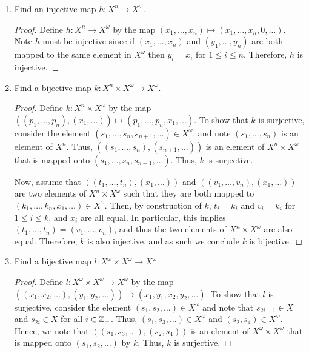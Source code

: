 \documentclass[12pt]{article}
\begin{document}
\begin{enumerate}[label=(\alph*)]
\begin{proof}
			Now, consider two different elements of $X^m \times X^n$ such
			that they are both mapped to the same element of $X^{m + n}$ under
			$g$. Due to how $g$ was constructed, note that the elements of 
			$X^m \times X^n$ must be equal, and thus $g$ is injective also.
		\end{proof}
		\item Find an injective map $h: X^n \to X^{\omega}$.
		\begin{proof}
			Define $h: X^n \to X^\omega$ by the map
			$(x_1, \ldots, x_n) \mapsto (x_1, \ldots, x_n, 0, \ldots)$.
			Note $h$ must be injective since if $(x_1, \ldots, x_n)$ and 
			$(y_1, \ldots, y_n)$ are both mapped to the same element in
			$X^\omega$ then $y_i = x_i$ for $1 \leq i \leq n$.
			Therefore, $h$ is injective.
		\end{proof}
		\item Find a bijective map $k: X^n \times X^{\omega} \to X^{\omega}$.
		\begin{proof}
			Define $k: X^n \times X^\omega$ by the map 
			$((p_1, \ldots, p_n), (x_1, \ldots)) \mapsto (p_1, \ldots, p_n, x_1, \ldots)$.
			To show that $k$ is surjective, consider the element 
			$(s_1, \ldots, s_n, s_{n+1}, \ldots) \in X^\omega$, and note 
			$(s_1, \ldots, s_n)$ is an element of $X^n$. Thus, $((s_1, \ldots, s_n), (s_{n + 1}, \ldots))$
			is an element of $X^n \times X^\omega$ that is mapped onto 
			$(s_1, \ldots, s_n, s_{n + 1}, \ldots)$. Thus, $k$ is surjective.

			Now, assume that $((t_1, \ldots, t_n), (x_1, \ldots))$ and 
			$((v_1, \ldots, v_n), (x_1, \ldots))$ are two elements of 
			$X^n \times X^\omega$ such that they are both mapped to 
			$(k_1, \ldots, k_n, x_1, \ldots) \in X^\omega$. Then, by construction
			of $k$, $t_i = k_i$ and $v_i = k_i$ for $1 \leq i \leq k$, and 
			$x_i$ are all equal. In particular, this implies
			$(t_1, \ldots, t_n) = (v_1, \ldots, v_n)$, and thus
			the two elements of $X^n \times X^\omega$ are also equal. 
			Therefore, $k$ is also injective, and as such we conclude 
			$k$ is bijective.
 		\end{proof}
		\item Find a bijective map $l: X^{\omega} \times X^{\omega} \to X^{\omega}$.
		\begin{proof}
			Define $l: X^\omega \times X^\omega \to X^\omega$ by the map
			$((x_1, x_2, \ldots), (y_1, y_2, \ldots)) \mapsto (x_1, y_1, x_2, y_2, \ldots)$.
			To show that $l$ is surjective, consider the element 
			$(s_1, s_2, \ldots) \in X^\omega$ and note that 
			$s_{2i - 1} \in X$ and $s_{2i} \in X$ for all $i \in \mathbb{Z}_{+}$. Thus,
			$(s_1, s_3, \ldots) \in X^\omega$ and $(s_2, s_4) \in X^\omega$.
			Hence, we note that $((s_1, s_3, \ldots), (s_2, s_4))$ is an element of $X^\omega \times X^\omega$
			that is mapped onto $(s_1, s_2, \ldots)$ by $k$. Thus,
			$k$ is surjective.


\end{proof}
\end{enumerate}
\end{document}
